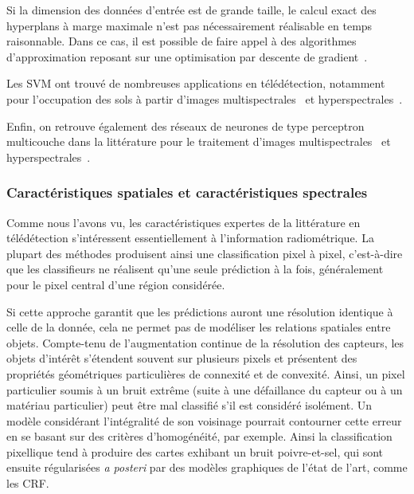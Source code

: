 Si la dimension des données d'entrée est de grande taille, le calcul exact des hyperplans à marge maximale n'est pas nécessairement réalisable en temps raisonnable. Dans ce cas, il est possible de faire appel à des algorithmes d'approximation reposant sur une optimisation par descente de gradient~\cite{bottou_large-scale_2010}.

Les \gls{SVM} ont trouvé de nombreuses applications en télédétection, notamment pour l'occupation des sols à partir d'images multispectrales~\cite{pal_support_2005} et hyperspectrales~\cite{melgani_classification_2004}.

Enfin, on retrouve également des réseaux de neurones de type perceptron multicouche dans la littérature pour le traitement d'images multispectrales~\cite{benediktsson_neural_1990} et hyperspectrales~\cite{goel_classification_2003}.

\subsubsection{Caractéristiques spatiales et caractéristiques spectrales}

Comme nous l'avons vu, les caractéristiques expertes de la littérature en télédétection s'intéressent essentiellement à l'information radiométrique. La plupart des méthodes produisent ainsi une classification pixel à pixel, c'est-à-dire que les classifieurs ne réalisent qu'une seule prédiction à la fois, généralement pour le pixel central d'une région considérée.

Si cette approche garantit que les prédictions auront une résolution identique à celle de la donnée, cela ne permet pas de modéliser les relations spatiales entre objets. Compte-tenu de l'augmentation continue de la résolution des capteurs, les objets d'intérêt s'étendent souvent sur plusieurs pixels et présentent des propriétés géométriques particulières de connexité et de convexité. Ainsi, un pixel particulier soumis à un bruit extrême (suite à une défaillance du capteur ou à un matériau particulier) peut être mal classifié s'il est considéré isolément. Un modèle considérant l'intégralité de son voisinage pourrait contourner cette erreur en se basant sur des critères d'homogénéité, par exemple. Ainsi la classification pixellique tend à produire des cartes exhibant un bruit poivre-et-sel, qui sont ensuite régularisées \emph{a posteri} par des modèles graphiques de l'état de l'art, comme les \gls{CRF}.

